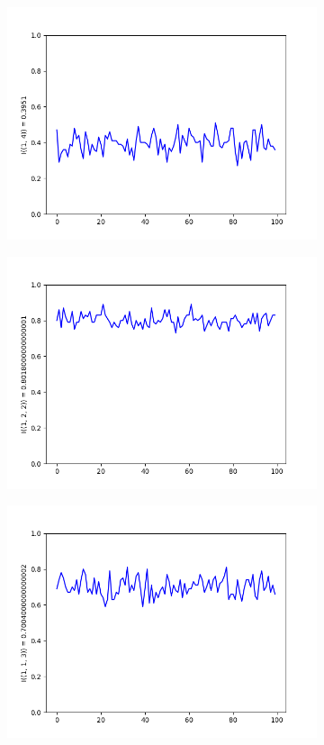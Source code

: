 \documentclass{llncs}
\begin{document}
\begin{figure}
\begin{subfigure}{0.5\linewidth}
\centering\includegraphics[scale=0.4]{images/1-4-consistent-partitions-probability.png}
\end{subfigure}
\begin{subfigure}{0.5\linewidth}
\centering\includegraphics[scale=0.4]{images/1-2-2-consistent-partitions-probability.png}
\end{subfigure}
\begin{subfigure}{0.5\linewidth}
\centering\includegraphics[scale=0.4]{images/1-1-3-consistent-partitions-probability.png}

\end{subfigure}
\end{figure}
\end{document}
